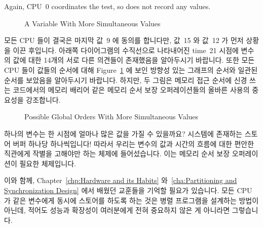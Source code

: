 Again, CPU~0 coordinates the test, so does not record any values.
\fi

\begin{figure}
\centering
{}
\caption{A Variable With More Simultaneous Values}
\end{figure}

모든 CPU 들이 결국은 마지막 값~9 에 동의를 합니다만, 값~15 와 값~12 가 먼저
상황을 이끈 후입니다.
아래쪽 다이어그램의 수직선으로 나타내어진 time~21 시점에 변수의 값에 대한
14개의 서로 다른 의견들이 존재했음을 알아두시기 바랍니다.
또한 모든 CPU 들이 값들의 순서에 대해
Figure~\ref{fig:memorder:Possible Global Orders With More Simultaneous Values}
에 보인 방향성 있는 그래프의 순서와 일관된 순서를 보았음을 알아두시기 바랍니다.
하지만, 두 그림은 메모리 접근 순서에 신경 쓰는 코드에서의 메모리 배리어 같은
메모리 순서 보장 오퍼레이션들의 올바른 사용의 중요성을 강조합니다.

\begin{figure}[htb]
\centering
{}
\caption{Possible Global Orders With More Simultaneous Values}
\label{fig:memorder:Possible Global Orders With More Simultaneous Values}
\end{figure}

하나의 변수는 한 시점에 얼마나 많은 값을 가질 수 있을까요?
시스템에 존재하는 스토어 버퍼 하나당 하나씩입니다!
따라서 우리는 변수의 값과 시간의 흐름에 대한 편안한 직관에게 작별을 고해야만
하는 체제에 들어섰습니다.
이는 메모리 순서 보장 오퍼레이션이 필요한 체제입니다.

이와 함께,
Chapter~\ref{chp:Hardware and its Habits}
와~\ref{cha:Partitioning and Synchronization Design} 에서 배웠던 교훈들을
기억할 필요가 있습니다.
모든 CPU 가 같은 변수에게 동시에 스토어를 하도록 하는 것은 병렬 프로그램을
설계하는 방법이 아닌데, 적어도 성능과 확장성이 여러분에게 전혀 중요하지 않은 게
아니라면 그렇습니다.

